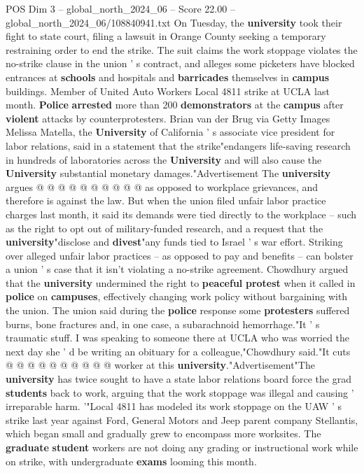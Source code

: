\begin{textsample}{POS Dim 3 – global\_north\_2024\_06 – Score 22.00 – global\_north\_2024\_06/108840941.txt}
On Tuesday, the \textbf{university} took their fight to state court, filing a lawsuit in Orange County seeking a temporary restraining order to end the strike.
The suit claims the work stoppage violates the no-strike clause in the union ' s contract, and alleges some picketers have blocked entrances at \textbf{schools} and hospitals and \textbf{barricades} themselves in \textbf{campus} buildings.
Member of United Auto Workers Local 4811 strike at UCLA last month. \textbf{Police} \textbf{arrested} more than 200 \textbf{demonstrators} at the \textbf{campus} after \textbf{violent} attacks by counterprotesters.
Brian van der Brug via Getty Images Melissa Matella, the \textbf{University} of California ' s associate vice president for labor relations, said in a statement that the strike"endangers life-saving research in hundreds of laboratories across the \textbf{University} and will also cause the \textbf{University} substantial monetary damages."Advertisement The \textbf{university} argues @ @ @ @ @ @ @ @ @ @ as opposed to workplace grievances, and therefore is against the law.
But when the union filed unfair labor practice charges last month, it said its demands were tied directly to the workplace -- such as the right to opt out of military-funded research, and a request that the \textbf{university}"disclose and \textbf{divest}"any funds tied to Israel ' s war effort.
Striking over alleged unfair labor practices -- as opposed to pay and benefits -- can bolster a union ' s case that it isn't violating a no-strike agreement.
Chowdhury argued that the \textbf{university} undermined the right to \textbf{peaceful} \textbf{protest} when it called in \textbf{police} on \textbf{campuses}, effectively changing work policy without bargaining with the union.
The union said during the \textbf{police} response some \textbf{protesters} suffered burns, bone fractures and, in one case, a subarachnoid hemorrhage."It ' s traumatic stuff.
I was speaking to someone there at UCLA who was worried the next day she ' d be writing an obituary for a colleague,"Chowdhury said."It cuts @ @ @ @ @ @ @ @ @ @ worker at this \textbf{university}."Advertisement"The \textbf{university} has twice sought to have a state labor relations board force the grad \textbf{students} back to work, arguing that the work stoppage was illegal and causing ' irreparable harm. '"Local 4811 has modeled its work stoppage on the UAW ' s strike last year against Ford, General Motors and Jeep parent company Stellantis, which began small and gradually grew to encompass more worksites.
The \textbf{graduate} \textbf{student} workers are not doing any grading or instructional work while on strike, with undergraduate \textbf{exams} looming this month.

\end{textsample}
